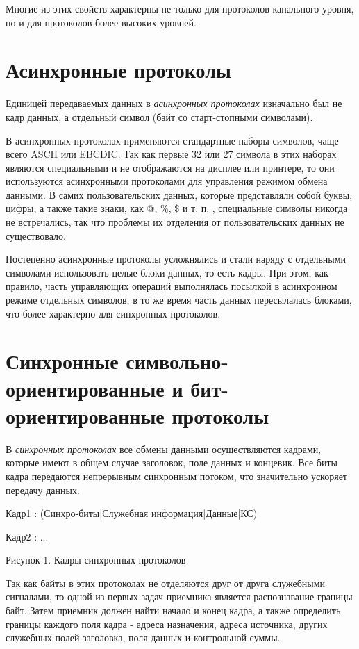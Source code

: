 Многие из этих свойств характерны не только для протоколов канального уровня, но и для протоколов более высоких уровней.

\section{Асинхронные протоколы}

Единицей передаваемых данных в \emph{асинхронных протоколах} изначально был не кадр данных, а отдельный символ (байт со старт-стопными символами).

В асинхронных протоколах применяются стандартные наборы символов, чаще всего ASCII или EBCDIC.
Так как первые 32 или 27 символа в этих наборах являются специальными и не отображаются на дисплее или принтере, то они используются асинхронными протоколами для управления режимом обмена данными.
В самих пользовательских данных, которые представляли собой буквы, цифры, а также такие знаки, как @, \%, \$ и т.
п.
, специальные символы никогда не встречались, так что проблемы их отделения от пользовательских данных не существовало.

Постепенно асинхронные протоколы усложнялись и стали наряду с отдельными символами использовать целые блоки данных, то есть кадры.
При этом, как правило, часть управляющих операций выполнялась посылкой в асинхронном режиме отдельных символов, в то же время часть данных пересылалась блоками, что более характерно для синхронных протоколов.

\section{Синхронные символьно-ориентированные и бит-ориентированные протоколы}

В \emph{синхронных протоколах} все обмены данными осуществляются кадрами, которые имеют в общем случае заголовок, поле данных и концевик.
Все биты кадра передаются непрерывным синхронным потоком, что значительно ускоряет передачу данных.

Кадр1 : (Синхро-биты|Служебная информация|Данные|КС)

Кадр2 : ...

Рисунок 1. Кадры синхронных протоколов

Так как байты в этих протоколах не отделяются друг от друга служебными сигналами, то одной из первых задач приемника является распознавание границы байт.
Затем приемник должен найти начало и конец кадра, а также определить границы каждого поля кадра - адреса назначения, адреса источника, других служебных полей заголовка, поля данных и контрольной суммы.

